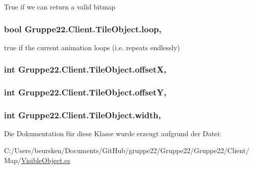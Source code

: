 True if we can return a valid bitmap 

\hypertarget{class_gruppe22_1_1_client_1_1_tile_object_aac8f058e227f664c4f5b930ee3b0bef4}{
\subsubsection[{loop}]{\setlength{\rightskip}{0pt plus 5cm}bool Gruppe22.\-Client.\-Tile\-Object.\-loop\hspace{0.3cm}{\ttfamily [get]}, {\ttfamily [set]}}}\label{class_gruppe22_1_1_client_1_1_tile_object_aac8f058e227f664c4f5b930ee3b0bef4}


true if the current animation loops (i.\-e. repeats endlessly) 

\hypertarget{class_gruppe22_1_1_client_1_1_tile_object_aca5785e249ae405b4c83551cd679e6bb}{
\subsubsection[{offset\-X}]{\setlength{\rightskip}{0pt plus 5cm}int Gruppe22.\-Client.\-Tile\-Object.\-offset\-X\hspace{0.3cm}{\ttfamily [get]}, {\ttfamily [set]}}}\label{class_gruppe22_1_1_client_1_1_tile_object_aca5785e249ae405b4c83551cd679e6bb}
\hypertarget{class_gruppe22_1_1_client_1_1_tile_object_a747e38501941605465e87c10c1f0dec3}{
\subsubsection[{offset\-Y}]{\setlength{\rightskip}{0pt plus 5cm}int Gruppe22.\-Client.\-Tile\-Object.\-offset\-Y\hspace{0.3cm}{\ttfamily [get]}, {\ttfamily [set]}}}\label{class_gruppe22_1_1_client_1_1_tile_object_a747e38501941605465e87c10c1f0dec3}
\hypertarget{class_gruppe22_1_1_client_1_1_tile_object_ad12970584aeb4e8ddcc748cbd24e11bd}{
\subsubsection[{width}]{\setlength{\rightskip}{0pt plus 5cm}int Gruppe22.\-Client.\-Tile\-Object.\-width\hspace{0.3cm}{\ttfamily [get]}, {\ttfamily [set]}}}\label{class_gruppe22_1_1_client_1_1_tile_object_ad12970584aeb4e8ddcc748cbd24e11bd}


Die Dokumentation für diese Klasse wurde erzeugt aufgrund der Datei\-:\begin{DoxyCompactItemize}
\item 
C\-:/\-Users/beursken/\-Documents/\-Git\-Hub/gruppe22/\-Gruppe22/\-Gruppe22/\-Client/\-Map/\hyperlink{_visible_object_8cs}{Visible\-Object.\-cs}\end{DoxyCompactItemize}

